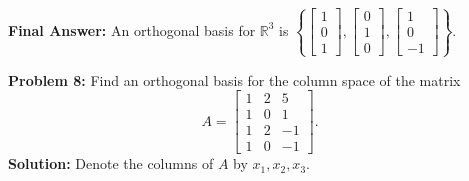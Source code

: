 \documentclass[11pt, letterpaper]{article}
\theoremstyle{definition}
\theoremstyle{remark}
\begin{document}
\textbf{Final Answer:} An orthogonal basis for $\mathbb{R}^3$ is $\left\{ \begin{bmatrix} 1 \\ 0 \\ 1 \end{bmatrix}, \begin{bmatrix} 0 \\ 1 \\ 0 \end{bmatrix}, \begin{bmatrix} 1 \\ 0 \\ -1 \end{bmatrix} \right\}$.

\vspace{0.8em}

\textbf{Problem 8:} Find an orthogonal basis for the column space of the matrix
\[
    A = \begin{bmatrix}
        1 & 2 & 5 \\
        1 & 0 & 1 \\
        1 & 2 & -1 \\
        1 & 0 & -1
    \end{bmatrix}.
\]
\textbf{Solution:} Denote the columns of $A$ by $x_1, x_2, x_3$.
\end{document}
